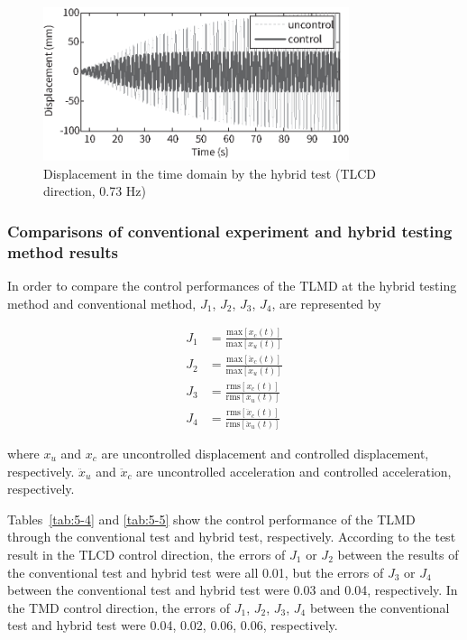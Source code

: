\begin{figure}[ht]
\centering
\includegraphics[width=0.8\textwidth] {figure/5-24.eps}
\caption{Displacement in the time domain by the hybrid test (TLCD direction, 0.73 Hz)}
\label{fig:5-24}
\end{figure}

\subsubsection{Comparisons of conventional experiment and hybrid testing method results}

In order to compare the control performances of the TLMD at the hybrid testing method and conventional method, $J_{1}$, $J_{2}$, $J_{3}$, $J_{4}$, are represented by

\begin{align}
J_{1}&=\frac{\text{max} \left[x_{c}(t) \right]}{\text{max} \left[x_{u}(t) \right]} \label{eq:5-14} \\
J_{2}&=\frac{\text{max} \left[\ddot{x}_{c}(t) \right]}{\text{max} \left[\ddot{x}_{u}(t) \right]} \label{eq:5-15} \\
J_{3}&=\frac{\text{rms} \left[x_{c}(t) \right]}{\text{rms} \left[x_{u}(t) \right]} \label{eq:5-16} \\
J_{4}&=\frac{\text{rms} \left[\ddot{x}_{c}(t) \right]}{\text{rms} \left[\ddot{x}_{u}(t) \right]} \label{eq:5-17}
\end{align}

where $x_{u}$ and $x_{c}$ are uncontrolled displacement and controlled displacement, respectively. $\ddot{x}_{u}$ and $\ddot{x}_{c}$ are uncontrolled acceleration and controlled acceleration, respectively.

Tables~\ref{tab:5-4} and \ref{tab:5-5} show the control performance of the TLMD through the conventional test and hybrid test, respectively. According to the test result in the TLCD control direction, the errors of $J_{1}$ or $J_{2}$ between the results of the conventional test and hybrid test were all 0.01, but the errors of $J_{3}$ or $J_{4}$ between the conventional test and hybrid test were 0.03 and 0.04, respectively. In the TMD control direction, the errors of $J_{1}$, $J_{2}$, $J_{3}$, $J_{4}$ between the conventional test and hybrid test were 0.04, 0.02, 0.06, 0.06, respectively.

